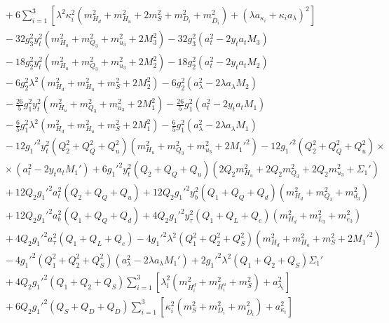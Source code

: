 \documentclass[preprint,amsmath,amssymb,aps,superscriptaddress,prd,showpacs,floatfix,nofootinbib]{revtex4-1}
\begin{document}
\begin{subequations}
\begin{align}
&{}+6\sum_{i=1}^3\left [ \lambda^2\kappa_i^2\left ( m_{H_d}^2+m_{H_u}^2+2m_S^2+m_{D_i}^2+m_{\overline{D}_i}^2\right )
+\left ( \lambda a_{\kappa_i}+\kappa_i a_\lambda\right )^2\right ]\nonumber\\
&{}-32g_3^2y_t^2\left ( m_{H_u}^2+m_{Q_3}^2+m_{u_3}^2+2M_3^2\right )-32g_3^2\left ( a_t^2-2y_ta_tM_3\right )\nonumber\\
&{}-18g_2^2y_t^2\left ( m_{H_u}^2+m_{Q_3}^2+m_{u_3}^2+2M_2^2\right )-18g_2^2\left ( a_t^2-2y_ta_tM_2\right )\\
&{}-6g_2^2\lambda^2\left ( m_{H_d}^2+m_{H_u}^2+m_S^2+2M_2^2\right )-6g_2^2\left ( a_\lambda^2-2\lambda a_\lambda M_2\right )\nonumber\\
&{}-\frac{26}{5}g_1^2y_t^2\left ( m_{H_u}^2+m_{Q_3}^2+m_{u_3}^2+2M_1^2\right )-\frac{26}{5}g_1^2\left ( a_t^2-2y_ta_tM_1\right )\nonumber\\
&{}-\frac{6}{5}g_1^2\lambda^2\left ( m_{H_d}^2+m_{H_u}^2+m_S^2+2M_1^2\right )-\frac{6}{5}g_1^2\left ( a_\lambda^2-2\lambda a_\lambda M_1\right )\nonumber\\
&{}-12g_1'^2y_t^2\left ( Q_2^2+Q_Q^2+Q_u^2\right )\left ( m_{H_u}^2+m_{Q_3}^2+m_{u_3}^2+2M_1'^2\right )-12g_1'^2\left ( Q_2^2+Q_Q^2+Q_u^2\right )\times\nonumber\\
&{}\times\left ( a_t^2-2y_ta_tM_1'\right )+6g_1'^2y_t^2\left ( Q_2+Q_Q+Q_u\right )\left ( 2Q_2m_{H_u}^2+2Q_2m_{Q_3}^2+2Q_2m_{u_3}^2+\Sigma_1'\right )\nonumber\\
&{}+12Q_2g_1'^2a_t^2\left ( Q_2+Q_Q+Q_u\right )+12Q_2g_1'^2y_b^2\left ( Q_1+Q_Q+Q_d\right )\left ( m_{H_d}^2+m_{Q_3}^2+m_{d_3}^2\right )\nonumber\\
&{}+12Q_2g_1'^2a_b^2\left ( Q_1+Q_Q+Q_d\right )+4Q_2g_1'^2y_\tau^2\left ( Q_1+Q_L+Q_e\right )\left ( m_{H_d}^2+m_{L_3}^2+m_{e_3}^2\right )\nonumber\\
&{}+4Q_2g_1'^2a_\tau^2\left ( Q_1+Q_L+Q_e\right )-4g_1'^2\lambda^2\left ( Q_1^2+Q_2^2+Q_S^2\right )\left ( m_{H_d}^2+m_{H_u}^2+m_S^2+2M_1'^2\right )\nonumber\\
&{}-4g_1'^2\left ( Q_1^2+Q_2^2+Q_S^2\right )\left ( a_\lambda^2-2\lambda a_\lambda M_1'\right )+2g_1'^2\lambda^2\left ( Q_1+Q_2+Q_S\right )\Sigma_1'\nonumber\\
&{}+4Q_2g_1'^2\left ( Q_1+Q_2+Q_S\right )\sum_{i=1}^3\left [ \lambda_i^2\left ( m_{H_i^d}^2+m_{H_i^u}^2+m_S^2\right )+a_{\lambda_i}^2\right ]\nonumber\\
&{}+6Q_2g_1'^2\left ( Q_S+Q_D+Q_{\overline{D}}\right )\sum_{i=1}^3\left [ \kappa_i^2\left ( m_S^2+m_{D_i}^2+m_{\overline{D}_i}^2\right )+a_{\kappa_i}^2\right ]\nonumber\\

\end{align}
\end{subequations}
\end{document}
